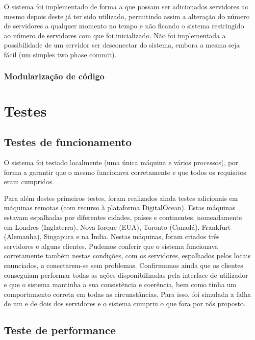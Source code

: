\documentclass[a4paper]{report}
\begin{document}
		O sistema foi implementado de forma a que possam ser adicionados servidores ao mesmo depois deste já ter sido utilizado, 
		permitindo assim a alteração do número de servidores a qualquer momento no tempo e não ficando o sistema restringido ao número de servidores com que foi inicializado.
		Não foi implementada a possibilidade de um servidor ser desconectar do sistema, embora a mesma seja fácil (um simples two phase commit).


		\subsection{Modularização de código}
	
\chapter{Testes}
	\section{Testes de funcionamento}
		O sistema foi testado localmente (uma única máquina e vários processos), por forma a garantir que o mesmo funcionava corretamente e que todos os requisitos eram cumpridos.

		Para além destes primeiros testes, foram realizados ainda testes adicionais em máquinas remotas (com recurso à plataforma DigitalOcean). Estas máquinas estavam espalhadas por diferentes cidades, países e continentes, 
		nomeadamente em Londres (Inglaterra), Nova Iorque (EUA), Toronto (Canadá), Frankfurt (Alemanha), Singapura e na Índia.
		Nestas máquinas, foram criados três servidores e alguns clientes. 
		Pudemos conferir que o sistema funcionava corretamente também nestas condições, com os servidores, espalhados pelos locais enunciados, a conectarem-se sem problemas.
		Confirmamos ainda que os clientes conseguiam performar todas as ações disponibilizadas pela interface de utilizador e que o sistema mantinha a sua consistência e coerência, 
		bem como tinha um comportamento correta em todas as circunstâncias. Para isso, foi simulada a falha de um e de dois dos servidores e o sistema cumpriu o que fora por nós proposto.

	\section{Teste de performance} %
\end{document}

